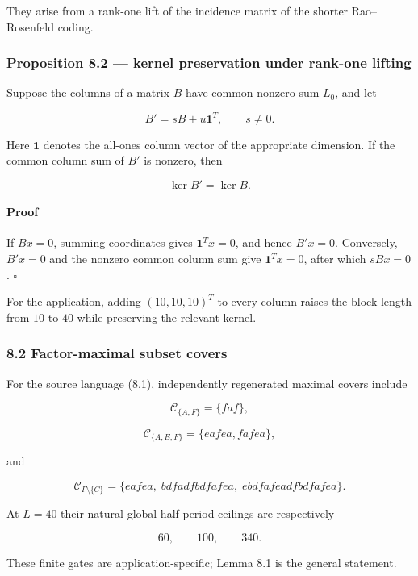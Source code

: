 \documentclass[
  british,
  a4paper,
  11pt]{article}
\begin{document}
They arise from a rank-one lift of the incidence matrix of the shorter
Rao--Rosenfeld coding.

\subsubsection{Proposition 8.2 --- kernel preservation under rank-one
lifting}\label{proposition-8.2-kernel-preservation-under-rank-one-lifting}

Suppose the columns of a matrix \(B\) have common nonzero sum \(L_0\),
and let

\[
B'=sB+u\mathbf 1^T,
\qquad s\ne0.
\]

Here \(\mathbf 1\) denotes the all-ones column vector of the appropriate
dimension. If the common column sum of \(B'\) is nonzero, then

\[
\ker B'=\ker B.
\]

\paragraph{Proof}\label{proof-7}

If \(Bx=0\), summing coordinates gives \(\mathbf 1^Tx=0\), and hence
\(B'x=0\). Conversely, \(B'x=0\) and the nonzero common column sum give
\(\mathbf 1^Tx=0\), after which \(sBx=0\). \(\square\)

For the application, adding \((10,10,10)^T\) to every column raises the
block length from \(10\) to \(40\) while preserving the relevant kernel.

\subsubsection{8.2 Factor-maximal subset
covers}\label{factor-maximal-subset-covers}

For the source language (8.1), independently regenerated maximal covers
include

\[
\mathcal C_{\{A,F\}}=\{faf\},
\]

\[
\mathcal C_{\{A,E,F\}}
=
\{eafea,fafea\},
\]

and

\[
\mathcal C_{\Gamma\setminus\{C\}}
=
\{eafea,\;bdfadfbdfafea,\;ebdfafeadfbdfafea\}.
\]

At \(L=40\) their natural global half-period ceilings are respectively

\[
60,\qquad100,\qquad340.
\]

These finite gates are application-specific; Lemma 8.1 is the general
statement.
\end{document}
